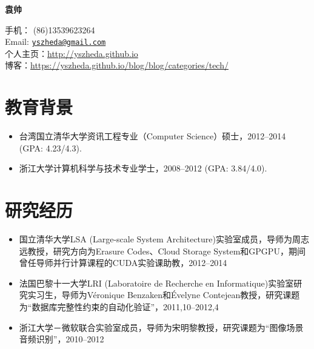 \documentclass[letterpaper]{article}
\def\name{袁帅}
\begin{document}
\centerline{\huge\bf \name} \vspace{0.25in}
\begin{minipage}[t]{0.8\textwidth}
  手机： (86)13539623264   \\
  Email: \href{mailto:yszheda@gmail.com}{\tt yszheda@gmail.com} \\
  个人主页：\url{http://yszheda.github.io} \\
  博客：\url{https://yszheda.github.io/blog/blog/categories/tech/}
\end{minipage}

\section*{教育背景}
\begin{itemize}
  \item 台湾国立清华大学资讯工程专业（Computer Science）硕士，2012--2014 (GPA: 4.23/4.3).
  \item 浙江大学计算机科学与技术专业学士，2008--2012 (GPA: 3.84/4.0).
\end{itemize}

\section*{研究经历}
\begin{itemize}
  \item 国立清华大学LSA (Large-scale System Architecture)实验室成员，导师为周志远教授，研究方向为Erasure Codes、Cloud Storage System和GPGPU，期间曾任导师并行计算课程的CUDA实验课助教，2012--2014
  \item 法国巴黎十一大学LRI (Laboratoire de Recherche en Informatique)实验室研究实习生，导师为V\'eronique Benzaken和\'Evelyne Contejean教授，研究课题为“数据库完整性约束的自动化验证”，2011,10--2012,4
  \item 浙江大学－微软联合实验室成员，导师为宋明黎教授，研究课题为“图像场景音频识别”，2010--2012
\end{itemize}
\end{document}
